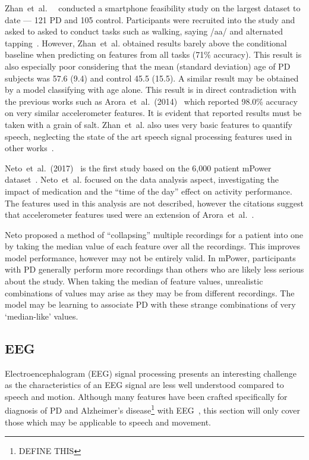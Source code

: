 \documentclass[12pt, twoside]{book}
\begin{document}
Zhan~et~al.~~\cite{zhan2016high} conducted a smartphone feasibility study on the largest dataset to date --- 121 PD and 105 control. Participants were recruited into the study and asked to asked to conduct tasks such as walking, saying /aa/ and alternated tapping~\cite{tapping}. However, Zhan~et~al. obtained results barely above the conditional baseline when predicting on features from all tasks (71\% accuracy). This result is also especially poor considering that the mean (standard deviation) age of PD subjects was 57.6 (9.4) and control 45.5 (15.5). A similar result may be obtained by a model classifying with age alone. This result is in direct contradiction with the previous works such as Arora~et~al.~(2014)~\cite{arora2014high} which reported 98.0\% accuracy on very similar accelerometer features. It is evident that reported results must be taken with a grain of salt. Zhan~et~al. also uses very basic features to quantify speech, neglecting the state of the art speech signal processing features used in other works~\cite{ostextbook, spoverview}. 


Neto~et~al.~(2017)~\cite{mpowerneto2017analysis} is the first study based on the 6,000 patient mPower dataset~\cite{mpower}. Neto~et~al. focused on the data analysis aspect, investigating the impact of medication and the ``time of the day'' effect on activity performance. The features used in this analysis are not described, however the citations suggest that accelerometer features used were an extension of Arora~et~al.~\cite{arora2014high}. 

Neto proposed a method of ``collapsing'' multiple recordings for a patient into one by taking the median value of each feature over all the recordings. This improves model performance, however may not be entirely valid. In mPower, participants with PD generally perform more recordings than others who are likely less serious about the study. When taking the median of feature values, unrealistic combinations of values may arise as they may be from different recordings. The model may be learning to associate PD with these strange combinations of very `median-like' values.

\subsection{EEG}
\label{eegsigproc}
Electroencephalogram (EEG) signal processing presents an interesting challenge as the characteristics of an EEG signal are less well understood compared to speech and motion. Although many features have been crafted specifically for diagnosis of PD and Alzheimer's disease\footnote{DEFINE THIS} with EEG~\cite{eegnonlinearpd, eegalzheimers}, this section will only cover those which may be applicable to speech and movement.
\end{document}
